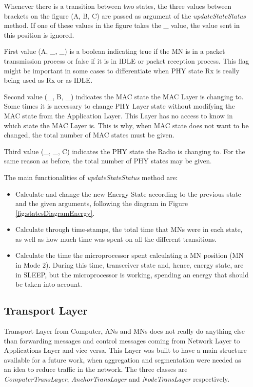 Whenever there is a transition between two states, the three values between brackets on the figure (A, B, C) are passed as argument of the 
\textit{updateStateStatus} method. If one of these values in the figure takes the \_ value, the value sent in this position is ignored.

First value (A, \_, \_) is a boolean indicating true if the \ac{MN} is in a packet transmission process or false if it is in IDLE or packet 
reception process. This flag might be important in some cases to differentiate when \ac{PHY} state \ac{Rx} is really being used as \ac{Rx} or as
IDLE.

Second value (\_, B, \_) indicates the \ac{MAC} state the \ac{MAC} Layer is changing to. Some times it is necessary to change \ac{PHY} Layer state
without modifying the \ac{MAC} state from the Application Layer. This Layer has no access to know in which state the \ac{MAC} Layer is. This is
why, when \ac{MAC} state does not want to be changed, the total number of \ac{MAC} states must be given.

Third value (\_, \_, C) indicates the \ac{PHY} state the Radio is changing to. For the same reason as before, the total number of \ac{PHY} states
may be given.

The main functionalities of \textit{updateStateStatus} method are:
\begin{itemize}
 \item Calculate and change the new Energy State according to the previous state and the given arguments, following the diagram in Figure
\ref{fig:statesDiagramEnergy}.
 \item Calculate through time-stamps, the total time that \acp{MN} were in each state, as well as how much time was spent on all the different
transitions.
 \item Calculate the time the microprocessor spent calculating a \ac{MN} position (\ac{MN} in Mode 2). During this time, transceiver
state and, hence, energy state, are in SLEEP, but the microprocessor is working, spending an energy that should be taken into account.
\end{itemize}

\subsection{Transport Layer}

Transport Layer from Computer, \acp{AN} and \acp{MN} does not really do anything else than forwarding messages and control messages coming from 
Network Layer to Applications Layer and vice versa. This Layer was built to have a main structure available for a future work, when 
aggregation and segmentation were needed as an idea to reduce traffic in the network. The three classes are \textit{ComputerTransLayer},
\textit{AnchorTransLayer} and \textit{NodeTransLayer} respectively.


